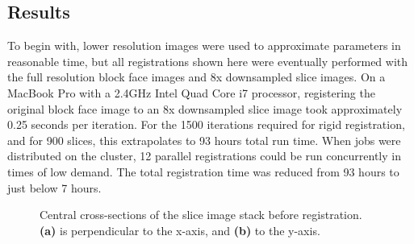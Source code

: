   \subsection{Results} %
  \label{sub:registration_results}
    To begin with, lower resolution images were used to approximate parameters in reasonable time, but all registrations shown here were eventually performed with the full resolution block face images and 8x downsampled slice images. On a MacBook Pro with a 2.4GHz Intel Quad Core i7 processor, registering the original block face image to an 8x downsampled slice image took approximately 0.25 seconds per iteration. For the 1500 iterations required for rigid registration, and for 900 slices, this extrapolates to 93 hours total run time. When jobs were distributed on the cluster, 12 parallel registrations could be run concurrently in times of low demand. The total registration time was reduced from 93 hours to just below 7 hours.
    
  	\begin{figure}
  	  \centering
  	  \caption{Central cross-sections of the slice image stack before registration. \textbf{(a)} is perpendicular to the x-axis, and \textbf{(b)} to the y-axis.}
  	  \label{fig:geometric_initialisation}
  	\end{figure}

